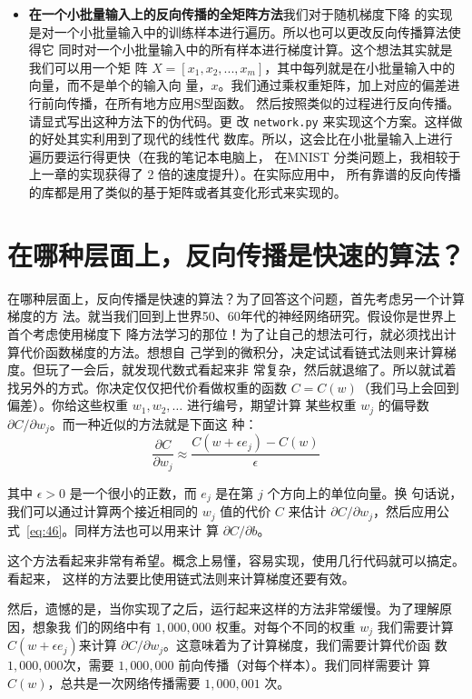 \begin{itemize}
\item \textbf{在一个小批量输入上的反向传播的全矩阵方法}\quad 我们对于随机梯度下降
  的实现是对一个小批量输入中的训练样本进行遍历。所以也可以更改反向传播算法使得它
  同时对一个小批量输入中的所有样本进行梯度计算。这个想法其实就是我们可以用一个矩
  阵
  $X=[x_1, x_2, ..., x_m]$，其中每列就是在小批量输入中的向量，而不是单个的输入向
  量，$x$。我们通过乘权重矩阵，加上对应的偏差进行前向传播，在所有地方应用S型函数。
  然后按照类似的过程进行反向传播。请显式写出这种方法下的伪代码。更
  改 \lstinline!network.py! 来实现这个方案。这样做的好处其实利用到了现代的线性代
  数库。所以，这会比在小批量输入上进行遍历要运行得更快（在我的笔记本电脑上，
  在MNIST 分类问题上，我相较于上一章的实现获得了 2 倍的速度提升）。在实际应用中，
  所有靠谱的反向传播的库都是用了类似的基于矩阵或者其变化形式来实现的。
\end{itemize}

\section{在哪种层面上，反向传播是快速的算法？}

在哪种层面上，反向传播是快速的算法？为了回答这个问题，首先考虑另一个计算梯度的方
法。就当我们回到上世界50、60年代的神经网络研究。假设你是世界上首个考虑使用梯度下
降方法学习的那位！为了让自己的想法可行，就必须找出计算代价函数梯度的方法。想想自
己学到的微积分，决定试试看链式法则来计算梯度。但玩了一会后，就发现代数式看起来非
常复杂，然后就退缩了。所以就试着找另外的方式。你决定仅仅把代价看做权重的函数 $C
= C(w)$（我们马上会回到偏差）。你给这些权重 $w_1, w_2, \ldots$ 进行编号，期望计算
某些权重 $w_j$ 的偏导数 $\partial C / \partial w_j$。而一种近似的方法就是下面这
种：
\begin{equation}  
  \frac{\partial
    C}{\partial w_{j}} \approx \frac{C(w+\epsilon
    e_j)-C(w)}{\epsilon}
  \label{eq:46}\tag{46}
\end{equation}

其中 $\epsilon > 0$ 是一个很小的正数，而 $e_j$ 是在第 $j$ 个方向上的单位向量。换
句话说，我们可以通过计算两个接近相同的 $w_j$ 值的代价 $C$ 来估计
$\partial C/\partial w_j$，然后应用公式~\eqref{eq:46}。同样方法也可以用来计
算 $\partial C/\partial b$。

这个方法看起来非常有希望。概念上易懂，容易实现，使用几行代码就可以搞定。看起来，
这样的方法要比使用链式法则来计算梯度还要有效。

然后，遗憾的是，当你实现了之后，运行起来这样的方法非常缓慢。为了理解原因，想象我
们的网络中有 $1,000,000$ 权重。对每个不同的权重 $w_j$ 我们需要计算 $C(w+\epsilon
e_j)$来计算 $\partial C/\partial w_j$。这意味着为了计算梯度，我们需要计算代价函
数 $1, 000, 000 $次，需要 $1, 000, 000$ 前向传播（对每个样本）。我们同样需要计
算 $C(w)$，总共是一次网络传播需要 $1,000,001$ 次。

